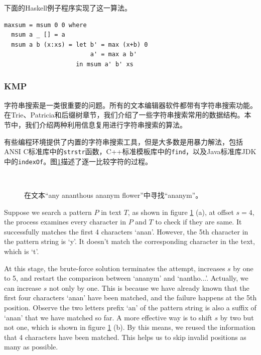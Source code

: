 \documentclass[UTF8]{article}
\begin{document}
下面的Haskell例子程序实现了这一算法。

\lstset{language=Haskell}
\begin{lstlisting}
maxsum = msum 0 0 where
  msum a _ [] = a
  msum a b (x:xs) = let b' = max (x+b) 0
                        a' = max a b'
                    in msum a' b' xs
\end{lstlisting}

\subsubsection{KMP}
 

字符串搜索是一类很重要的问题。所有的文本编辑器软件都带有字符串搜索功能。在Trie、Patricia和后缀树章节，我们介绍了一些字符串搜索常用的数据结构。本节中，我们介绍两种利用信息复用进行字符串搜索的算法。

有些编程环境提供了内置的字符串搜索工具，但是大多数是用暴力解法，包括ANSI C标准库中的\texttt{strstr}函数，C++标准模板库中的\texttt{find}，以及Java标准库JDK中的\texttt{indexOf}。图\ref{fig:strstr}描述了逐一比较字符的过程。

\begin{figure}[htbp]
 \centering
 \subfloat[Offset为$s = 4$，接着，连续有$q=4$个字符相同，但是第5个字符不同。]{} \\
 \subfloat[比较的起始位置移动到$s = 4 + 2 = 6$。]{}
 \caption{在文本“any ananthous ananym flower”中寻找“ananym”。}
 \label{fig:strstr}
\end{figure}

Suppose we search a pattern $P$ in text $T$, as shown in figure \ref{fig:strstr} (a), at offset $s = 4$,
the process examines every character in $P$ and $T$ to check if they are same. It successfully matches
the first 4 characters `anan'. However, the 5th character in the pattern string is `y'. It doesn't match
the corresponding character in the text, which is `t'.

At this stage, the brute-force solution terminates the attempt, increases $s$ by one to 5, and restart the
comparison between `ananym' and `nantho...'. Actually, we can increase $s$ not only by one. This is because
we have already known that the first four characters `anan' have been matched, and the failure happens
at the 5th position. Observe the two letters prefix `an' of the pattern string is also a suffix of
`anan' that we have matched so far. A more effective way is to shift $s$ by two but not one, which is
shown in figure \ref{fig:strstr} (b). By this means, we reused the information that 4 characters have
been matched. This helps us to skip invalid positions as many as possible.
\end{document}
